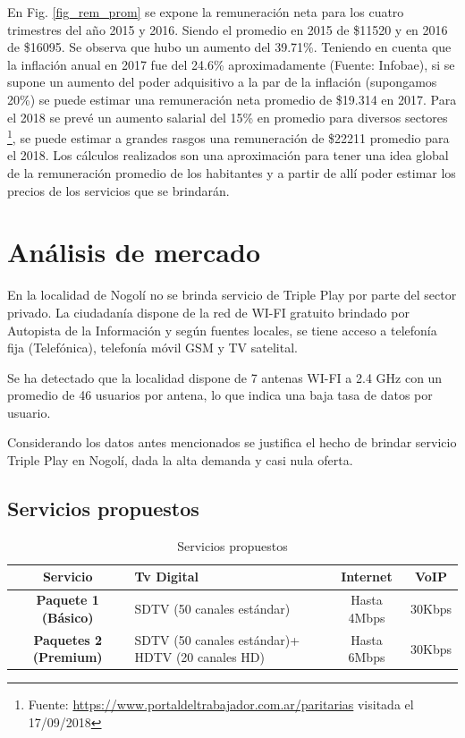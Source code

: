 \documentclass[12pt,a4paper]{book}
\begin{document}
En Fig. \ref{fig_rem_prom} se expone la remuneración neta para los cuatro trimestres del año 2015 y 2016. Siendo el promedio en 2015 de \$11520 y en 2016 de \$16095. Se observa que hubo un aumento del 39.71\%. Teniendo en cuenta que la inflación anual en 2017 fue del 24.6\% aproximadamente (Fuente: Infobae), si se supone un aumento del poder adquisitivo a la par de la inflación (supongamos 20\%) se puede estimar una remuneración neta promedio de \$19.314 en 2017. Para el 2018 se prevé un aumento salarial del 15\% en promedio para diversos sectores \footnote{Fuente: \url{https://www.portaldeltrabajador.com.ar/paritarias} visitada el 17/09/2018}, se puede estimar a grandes rasgos una remuneración de \$22211 promedio para el 2018. Los cálculos realizados son una aproximación para tener una idea global de la remuneración promedio de los habitantes y a partir de allí poder estimar los precios de los servicios que se brindarán.



\chapter{Análisis de mercado} \label{sec_analisis_mercado}

En la localidad de Nogolí no se brinda servicio de Triple Play por parte del sector privado. La ciudadanía dispone de la red de WI-FI gratuito brindado por Autopista de la Información y según fuentes locales, se tiene acceso a telefonía fija (Telefónica), telefonía móvil GSM y TV satelital.

Se ha detectado que la localidad dispone de 7 antenas WI-FI a 2.4 GHz con un promedio de 46 usuarios por antena, lo que indica una baja tasa de datos por usuario.

Considerando los datos antes mencionados se justifica el hecho de brindar servicio Triple Play en Nogolí, dada la alta demanda y casi nula oferta.

\section{Servicios propuestos}

\begin{table}[H]
\centering
\begin{tabular}{|c|>{\centering}m{6cm}|c|c|}
\hline 
\textbf{Servicio} & \textbf{Tv Digital} & \textbf{Internet} & \textbf{VoIP} \\ 
\hline 
\textbf{Paquete 1 (Básico)} & SDTV (50 canales estándar) & Hasta 4Mbps & 30Kbps \\ 
\hline 
\textbf{Paquetes 2 (Premium)} & SDTV (50 canales estándar)+ HDTV (20 canales HD) & Hasta 6Mbps & 30Kbps \\ 
\hline 
\end{tabular}
\caption{Servicios propuestos}
\label{tab_serv_prop_dem}
\end{table}
\end{document}

